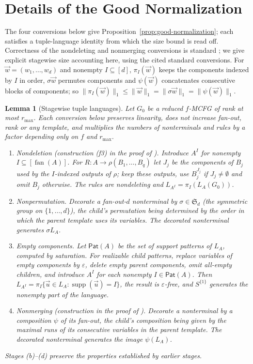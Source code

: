 \documentclass[11pt]{article}
\numberwithin{equation}{section}
\theoremstyle{plain}
\newtheorem{lemma}[theorem]{Lemma}
\theoremstyle{definition}
\theoremstyle{remark}
\newcommand{\tuple}[1]{\vec{#1}}
\newcommand{\eps}{\varepsilon}
\newcommand{\fan}{\operatorname{fan}}
\theoremstyle{plain}
\begin{document}
\section{Details of the Good Normalization}
\label{app:normalization-details}

The four conversions below give Proposition~\ref{prop:good-normalization}; each satisfies
a tuple-language identity from which the size bound is read off.  Correctness of the
nondeleting and nonmerging conversions is standard
\cite{SekiEtAl1991,Kanazawa2019Ogden,Yoshinaka2011}; we give explicit stagewise
size accounting here, using the cited standard conversions.  For
$\tuple w=(w_1,\ldots,w_d)$ and nonempty $I\subseteq[d]$, $\pi_I(\tuple w)$ keeps the
components indexed by $I$ in order, $\sigma\tuple w$ permutes components and
$\psi(\tuple w)$ concatenates consecutive blocks of components; so
$\|\pi_I(\tuple w)\|_1\le\|\tuple w\|_1=\|\sigma\tuple w\|_1=\|\psi(\tuple w)\|_1$.

\begin{lemma}[Stagewise tuple languages]
\label{lem:normalization-stages}
Let $G_0$ be a reduced $f$-MCFG of rank at most $r_{\max}$.  Each conversion below
preserves linearity, does not increase fan-out, rank or any template, and multiplies the
numbers of nonterminals and rules by a factor depending only on $f$ and $r_{\max}$.
\begin{enumerate}[label=\textup{(\alph*)},leftmargin=*]
\item \emph{Nondeletion} (construction (f3) in the proof of
\cite[Lemma~2.2]{SekiEtAl1991}).  Introduce $A^I$ for nonempty $I\subseteq[\fan(A)]$.
For $R:A\to\rho(B_1,\ldots,B_q)$ let $J_j$ be the components of $B_j$ used by the
$I$-indexed outputs of $\rho$; keep these outputs, use $B_j^{J_j}$ if $J_j\ne\emptyset$
and omit $B_j$ otherwise.  The rules are nondeleting and $L_{A^I}=\pi_I(L_A(G_0))$.
\item \emph{Nonpermutation.}  Decorate a fan-out-$d$ nonterminal by
$\sigma\in\mathfrak S_d$ (the symmetric group on $\{1,\ldots,d\}$),
the child's permutation being determined by the order in which
the parent template uses its variables.  The decorated nonterminal generates
$\sigma L_A$.
\item \emph{Empty components.}  Let $\mathsf{Pat}(A)$ be the set of support patterns of
$L_A$, computed by saturation.  For realizable child patterns, replace variables of
empty components by $\eps$, delete empty parent components, omit all-empty children,
and introduce $A^I$ for each nonempty $I\in\mathsf{Pat}(A)$.  Then
$L_{A^I}=\pi_I\{\tuple u\in L_A:\operatorname{supp}(\tuple u)=I\}$, the result is
$\eps$-free, and $S^{\{1\}}$ generates the nonempty part of the language.
\item \emph{Nonmerging} (construction in the proof of
\cite[Section~2.3, Lemma~1]{Yoshinaka2011}).  Decorate a nonterminal by a composition
$\psi$ of its fan-out, the child's composition being given by the maximal runs of its
consecutive variables in the parent template.  The decorated nonterminal generates the
image $\psi(L_A)$.
\end{enumerate}
Stages (b)--(d) preserve the properties established by earlier stages.
\end{lemma}
\end{document}
